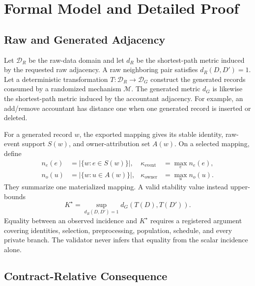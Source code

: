 \documentclass[letterpaper]{article} %
\newcommand{\ke}{\kappa_{\mathrm{event}}}
\newcommand{\ko}{\kappa_{\mathrm{owner}}}
\begin{document}
\section{Formal Model and Detailed Proof}
\label{sec:supp-formal}

\subsection{Raw and Generated Adjacency}

Let $\mathcal{D}_R$ be the raw-data domain and let $d_R$ be the shortest-path
metric induced by the requested raw adjacency.  A raw neighboring pair
satisfies $d_R(D,D')=1$.  Let a deterministic transformation
$T:\mathcal{D}_R\rightarrow\mathcal{D}_G$ construct the generated records
consumed by a randomized mechanism $\mathcal{M}$.  The generated metric $d_G$
is likewise the shortest-path metric induced by the accountant adjacency.
For example, an add/remove accountant has distance one when one generated
record is inserted or deleted.

For a generated record $w$, the exported mapping gives its stable identity,
raw-event support $S(w)$, and owner-attribution set $A(w)$.  On a selected
mapping, define
\[
\begin{aligned}
  n_e(e)&=\left|\{w:e\in S(w)\}\right|,
  &\ke&=\max_e n_e(e),\\
  n_o(u)&=\left|\{w:u\in A(w)\}\right|,
  &\ko&=\max_u n_o(u).
\end{aligned}
\]
They summarize one materialized mapping.  A valid stability value instead
upper-bounds
\[
  K^\star=\sup_{d_R(D,D')=1}d_G\!\left(T(D),T(D')\right).
\]
Equality between an observed incidence and $K^\star$ requires a registered
argument covering identities, selection, preprocessing, population,
schedule, and every private branch.  The validator never infers that equality
from the scalar incidence alone.

\subsection{Contract-Relative Consequence}
\end{document}
